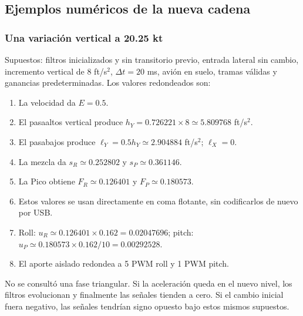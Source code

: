 \subsection{Ejemplos numéricos de la nueva cadena}
\subsubsection{Una variación vertical a 20.25 kt}
Supuestos: filtros inicializados y sin transitorio previo, entrada lateral sin cambio, incremento vertical de 8 ft/s$^2$, $\Delta t=20$ ms, avión en suelo, tramas válidas y ganancias predeterminadas. Los valores redondeados son:
\begin{enumerate}
\item La velocidad da $E=0.5$.
\item El pasaaltos vertical produce $h_Y=0.726221\times8\simeq5.809768$ ft/s$^2$.
\item El pasabajos produce $\ell_Y=0.5h_Y\simeq2.904884$ ft/s$^2$; $\ell_X=0$.
\item La mezcla da $s_R\simeq0.252802$ y $s_P\simeq0.361146$.
\item La Pico obtiene $F_R\simeq0.126401$ y $F_P\simeq0.180573$.
\item Estos valores se usan directamente en coma flotante, sin codificarlos de nuevo por USB.
\item Roll: $u_R\simeq0.126401\times0.162=0.02047696$; pitch: $u_P\simeq0.180573\times0.162/10=0.00292528$.
\item El aporte aislado redondea a 5 PWM roll y 1 PWM pitch.
\end{enumerate}
No se consultó una fase triangular. Si la aceleración queda en el nuevo nivel, los filtros evolucionan y finalmente las señales tienden a cero. Si el cambio inicial fuera negativo, las señales tendrían signo opuesto bajo estos mismos supuestos.

